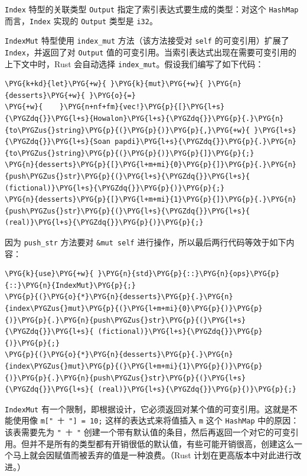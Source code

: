 \texttt{Index} 特型的关联类型 \texttt{Output} 指定了索引表达式要生成的类型：对这个 \texttt{HashMap} 而言，\texttt{Index} 实现的 \texttt{Output} 类型是 \texttt{i32}。

\texttt{IndexMut} 特型使用 \texttt{index\_mut} 方法（该方法接受对 \texttt{self} 的可变引用）扩展了 \texttt{Index}，并返回了对 \texttt{Output} 值的可变引用。当索引表达式出现在需要可变引用的上下文中时，Rust 会自动选择 \texttt{index\_mut}。假设我们编写了如下代码：

\begin{Verbatim}[commandchars=\\\{\},breaklines=true,breakanywhere=true,fontsize=\codefont,xleftmargin=17bp]
\PYG{k+kd}{let}\PYG{+w}{ }\PYG{k}{mut}\PYG{+w}{ }\PYG{n}{desserts}\PYG{+w}{ }\PYG{o}{=}
\PYG{+w}{    }\PYG{n+nf+fm}{vec!}\PYG{p}{[}\PYG{l+s}{\PYGZdq{}}\PYG{l+s}{Howalon}\PYG{l+s}{\PYGZdq{}}\PYG{p}{.}\PYG{n}{to\PYGZus{}string}\PYG{p}{(}\PYG{p}{)}\PYG{p}{,}\PYG{+w}{ }\PYG{l+s}{\PYGZdq{}}\PYG{l+s}{Soan papdi}\PYG{l+s}{\PYGZdq{}}\PYG{p}{.}\PYG{n}{to\PYGZus{}string}\PYG{p}{(}\PYG{p}{)}\PYG{p}{]}\PYG{p}{;}
\PYG{n}{desserts}\PYG{p}{[}\PYG{l+m+mi}{0}\PYG{p}{]}\PYG{p}{.}\PYG{n}{push\PYGZus{}str}\PYG{p}{(}\PYG{l+s}{\PYGZdq{}}\PYG{l+s}{ (fictional)}\PYG{l+s}{\PYGZdq{}}\PYG{p}{)}\PYG{p}{;}
\PYG{n}{desserts}\PYG{p}{[}\PYG{l+m+mi}{1}\PYG{p}{]}\PYG{p}{.}\PYG{n}{push\PYGZus{}str}\PYG{p}{(}\PYG{l+s}{\PYGZdq{}}\PYG{l+s}{ (real)}\PYG{l+s}{\PYGZdq{}}\PYG{p}{)}\PYG{p}{;}
\end{Verbatim}

因为 \texttt{push\_str} 方法要对 \texttt{\&mut self} 进行操作，所以最后两行代码等效于如下内容：

\begin{Verbatim}[commandchars=\\\{\},breaklines=true,breakanywhere=true,fontsize=\codefont,xleftmargin=17bp]
\PYG{k}{use}\PYG{+w}{ }\PYG{n}{std}\PYG{p}{::}\PYG{n}{ops}\PYG{p}{::}\PYG{n}{IndexMut}\PYG{p}{;}
\PYG{p}{(}\PYG{o}{*}\PYG{n}{desserts}\PYG{p}{.}\PYG{n}{index\PYGZus{}mut}\PYG{p}{(}\PYG{l+m+mi}{0}\PYG{p}{)}\PYG{p}{)}\PYG{p}{.}\PYG{n}{push\PYGZus{}str}\PYG{p}{(}\PYG{l+s}{\PYGZdq{}}\PYG{l+s}{ (fictional)}\PYG{l+s}{\PYGZdq{}}\PYG{p}{)}\PYG{p}{;}
\PYG{p}{(}\PYG{o}{*}\PYG{n}{desserts}\PYG{p}{.}\PYG{n}{index\PYGZus{}mut}\PYG{p}{(}\PYG{l+m+mi}{1}\PYG{p}{)}\PYG{p}{)}\PYG{p}{.}\PYG{n}{push\PYGZus{}str}\PYG{p}{(}\PYG{l+s}{\PYGZdq{}}\PYG{l+s}{ (real)}\PYG{l+s}{\PYGZdq{}}\PYG{p}{)}\PYG{p}{;}
\end{Verbatim}

\texttt{IndexMut} 有一个限制，即根据设计，它必须返回对某个值的可变引用。这就是不能使用像 \texttt{m[" 十 "] = 10;} 这样的表达式来将值插入 \texttt{m} 这个 \texttt{HashMap} 中的原因：该表需要先为 \texttt{" 十 "} 创建一个带有默认值的条目，然后再返回一个对它的可变引用。但并不是所有的类型都有开销很低的默认值，有些可能开销很高，创建这么一个马上就会因赋值而被丢弃的值是一种浪费。（Rust 计划在更高版本中对此进行改进。）

